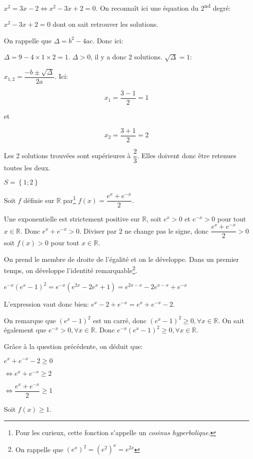 \documentclass[a4paper,12pt]{scrartcl}
\begin{document}
$x^2 = 3x-2 \Leftrightarrow x^2 - 3x + 2 = 0$. On reconnaît ici une équation du 2\textsuperscript{nd} degré:

$x^2 - 3x + 2 = 0$ dont on sait retrouver les solutions.

On rappelle que $\Delta = b^2 - 4ac$. Donc ici:

$\Delta = 9 - 4 \times 1 \times 2 = 1$. $\Delta > 0$, il y a donc 2 solutions. $\sqrt{\Delta} = 1$:

$x_{1,2} = \dfrac{-b \pm \sqrt{\Delta}}{2a}$. Ici:

$$x_1 = \dfrac{3-1}{2} = 1$$

et 

$$x_2 = \dfrac{3+1}{2} = 2$$

Les 2 solutions trouvées sont supérieures à $\dfrac{2}{3}$. Elles doivent donc être retenues toutes les deux.

$S = \left\lbrace 1 ; 2 \right\rbrace$

\exo{}
Soit $f$ définie sur $\mathbb{R}$ par\footnote{Pour les curieux, cette fonction s'appelle un \emph{cosinus hyperbolique}.} $f(x) = \dfrac{e^x + e^{-x}}{2}$. 

\question{}
Une exponentielle est strictement positive sur $\mathbb{R}$, soit $e^x > 0$ et $e^{-x} > 0$ pour tout $x \in \mathbb{R}$. Donc $e^x + e^{-x} > 0$. Diviser par 2 ne change pas le signe, donc $\dfrac{e^x + e^{-x}}{2} > 0$ soit $f(x) > 0$ pour tout $x \in \mathbb{R}$.

\question{}
On prend le membre de droite de l'égalité et on le développe. Dans un premier temps, on développe l'identité remarquable\footnote{On rappelle que $\left(e^x\right)^2 = \left(e^2\right)^x = e^{2x}$}.

$e^{-x}(e^x-1)^2 = e^{-x}(e^{2x} - 2e^x + 1) = e^{2x-x} - 2e^{x-x} + e^{-x}$

L'expression vaut donc bien: $e^x - 2 + e^{-x} = e^x + e^{-x} - 2$. 

On remarque que $(e^x-1)^2$ est un carré, donc $(e^x-1)^2 \geqslant 0, \forall x \in \mathbb{R}$. On sait également que $e^{-x} > 0, \forall x \in \mathbb{R}$. Donc $e^{-x}(e^x-1)^2 \geqslant 0, \forall x \in \mathbb{R}$.

Grâce à la question précédente, on déduit que: 

$e^x + e^{-x} - 2 \geqslant 0$

$\Leftrightarrow e^x + e^{-x} \geqslant 2$ 

$\Leftrightarrow \dfrac{e^x + e^{-x}}{2} \geqslant 1$

Soit $f(x) \geqslant 1$.

\trait
\end{document}
